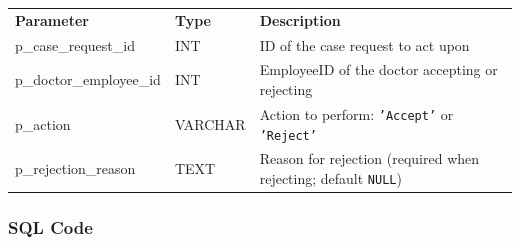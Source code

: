 \documentclass{article}
\newcommand{\theadcell}{\color{white}\bfseries}
\begin{document}
\begin{center}
\begin{tabular}{L{4.5cm} L{2.5cm} L{6.5cm}}
   \theadcell Parameter & \theadcell Type & \theadcell Description \\
   p\_case\_request\_id   & INT     & ID of the case request to act upon \\
   p\_doctor\_employee\_id & INT     & EmployeeID of the doctor accepting or rejecting \\
   p\_action             & VARCHAR & Action to perform: \texttt{'Accept'} or \texttt{'Reject'} \\
   p\_rejection\_reason  & TEXT    & Reason for rejection (required when rejecting; default \texttt{NULL}) \\
\end{tabular}
\end{center}

\subsubsection{SQL Code}
\end{document}

